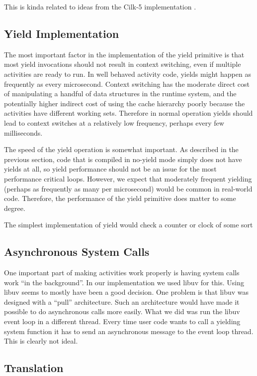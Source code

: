 \documentclass[10pt,preprint]{sigplanconf}
\begin{document}
This is kinda related to ideas from the Cilk-5 implementation
\cite{Frigo1998}.

\subsection{Yield Implementation}

The most important factor in the implementation of the yield primitive is that most yield invocations should not result in context switching, even if multiple activities are ready to run.
In well behaved activity code, yields might happen as frequently as every microsecond.
Context switching has the moderate direct cost of manipulating a handful of data structures in the runtime system, and the potentially higher indirect cost of using the cache hierarchy poorly because the activities have different working sets.
Therefore in normal operation yields should lead to context switches at a relatively low frequency, perhaps every few milliseconds.

The speed of the yield operation is somewhat important.
As described in the previous section, code that is compiled in no-yield mode simply does not have yields at all, so yield performance should not be an issue for the most performance critical loops.
However, we expect that moderately frequent yielding (perhaps as frequently as many per microsecond) would be common in real-world code.
Therefore, the performance of the yield primitive does matter to some degree.

The simplest implementation of yield would check a counter or clock of some sort

\subsection{Asynchronous System Calls}

One important part of making activities work properly is having system calls work ``in the background''.
In our implementation we used libuv for this.
Using libuv seems to mostly have been a good decision.
One problem is that libuv was designed with a ``pull'' architecture.
Such an architecture would have made it possible to do asynchronous calls more easily.
What we did was run the libuv event loop in a different thread.
Every time user code wants to call a yielding system function it has to send an asynchronous message to the event loop thread.
This is clearly not ideal.

\subsection{Translation}
\end{document}
